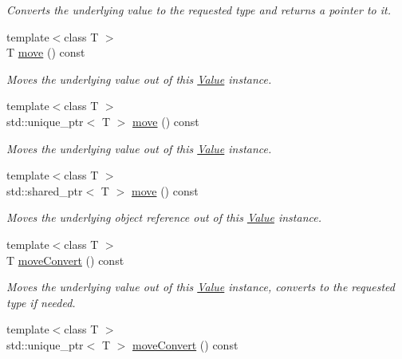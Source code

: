 \begin{DoxyCompactItemize}
\begin{DoxyCompactList}\small\item\em Converts the underlying value to the requested type and returns a pointer to it. \end{DoxyCompactList}\item 
{\footnotesize template$<$class T $>$ }\\T \hyperlink{classdg_1_1deepcore_1_1_value_a6ff4d816f62e429bf0af2ccbd237c547}{move} () const 
\begin{DoxyCompactList}\small\item\em Moves the underlying value out of this \hyperlink{classdg_1_1deepcore_1_1_value}{Value} instance. \end{DoxyCompactList}\item 
{\footnotesize template$<$class T $>$ }\\std\+::unique\+\_\+ptr$<$ T $>$ \hyperlink{classdg_1_1deepcore_1_1_value_ac4ff3f182f7bb0a445eb113925eba3a3}{move} () const 
\begin{DoxyCompactList}\small\item\em Moves the underlying value out of this \hyperlink{classdg_1_1deepcore_1_1_value}{Value} instance. \end{DoxyCompactList}\item 
{\footnotesize template$<$class T $>$ }\\std\+::shared\+\_\+ptr$<$ T $>$ \hyperlink{classdg_1_1deepcore_1_1_value_a0156e29d76bf9c3dc52a141c4dc3749e}{move} () const 
\begin{DoxyCompactList}\small\item\em Moves the underlying object reference out of this \hyperlink{classdg_1_1deepcore_1_1_value}{Value} instance. \end{DoxyCompactList}\item 
{\footnotesize template$<$class T $>$ }\\T \hyperlink{classdg_1_1deepcore_1_1_value_aed8ec02002383d1080309b16e9f422ec}{move\+Convert} () const 
\begin{DoxyCompactList}\small\item\em Moves the underlying value out of this \hyperlink{classdg_1_1deepcore_1_1_value}{Value} instance, converts to the requested type if needed. \end{DoxyCompactList}\item 
{\footnotesize template$<$class T $>$ }\\std\+::unique\+\_\+ptr$<$ T $>$ \hyperlink{classdg_1_1deepcore_1_1_value_a2abede580e0f9f9f1ff0144d4c45133b}{move\+Convert} () const 

\end{DoxyCompactItemize}
